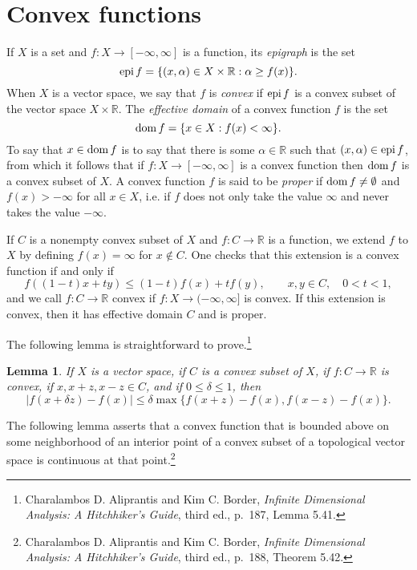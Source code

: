 \documentclass{article}
\newcommand{\epi}{\ensuremath\mathrm{epi}\,}
\newcommand{\dom}{\ensuremath\mathrm{dom}\,}
\newtheorem{lemma}[theorem]{Lemma}
\theoremstyle{definition}
\begin{document}
\section{Convex functions}
If $X$ is a set and $f:X \to [-\infty,\infty]$ is a function, its {\em epigraph} is the set
\[
\epi f=\{(x,\alpha) \in X \times \mathbb{R} : \alpha \geq f(x)\}.
\]
When $X$ is a vector space,
we say that $f$ is {\em convex} if $\epi f$ is a convex subset of the vector space $X \times \mathbb{R}$. 
The {\em effective domain} of a convex function $f$ is the set
\[
\dom f = \{x \in X: f(x)< \infty\}.
\]
To say that $x \in \dom f$ is to say that there is some $\alpha \in \mathbb{R}$ such that $(x,\alpha) \in \epi f$, from which
it follows that if $f:X \to [-\infty,\infty]$ is a convex function  then $\dom f$ is a convex subset of $X$.
A convex function $f$ is said to be {\em proper} if $\dom f \neq \emptyset$ and $f(x)>-\infty$ for all $x \in X$,
i.e. if $f$ does not only take the value $\infty$ and never takes the value $-\infty$.


If $C$ is a nonempty convex subset of $X$ and $f:C \to \mathbb{R}$ is a function, we extend $f$ to $X$ by defining $f(x)=\infty$
for $x \not \in C$.  One checks that this extension is a convex function if and only if 
\[
f((1-t)x+ty) \leq (1-t)f(x)+tf(y), \qquad x,y \in C, \quad 0<t<1,
\]
and we call $f:C \to \mathbb{R}$ convex if $f:X \to (-\infty,\infty]$ is convex.
If this extension  is convex, then it has effective domain $C$ and is proper. 



The following lemma is straightforward to prove.\footnote{Charalambos D. Aliprantis and Kim C. Border,
{\em Infinite Dimensional Analysis: A Hitchhiker's Guide}, third ed., p.~187, Lemma 5.41.}

\begin{lemma}
If $X$ is a vector space, if $C$ is a convex subset of $X$, if $f:C \to \mathbb{R}$ is convex, if $x,x+z,x-z \in C$,
and if $0 \leq \delta \leq 1$, then
\[
|f(x+\delta z)-f(x)| \leq \delta \max \{f(x+z)-f(x),f(x-z)-f(x)\}.
\]
\label{convexinequality}
\end{lemma}


The following lemma asserts that a convex function that is bounded above on some neighborhood of  an interior point of a convex subset of a topological
vector space is continuous at that
point.\footnote{Charalambos D. Aliprantis and Kim C. Border,
{\em Infinite Dimensional Analysis: A Hitchhiker's Guide}, third ed., p.~188, Theorem 5.42.}
\end{document}
